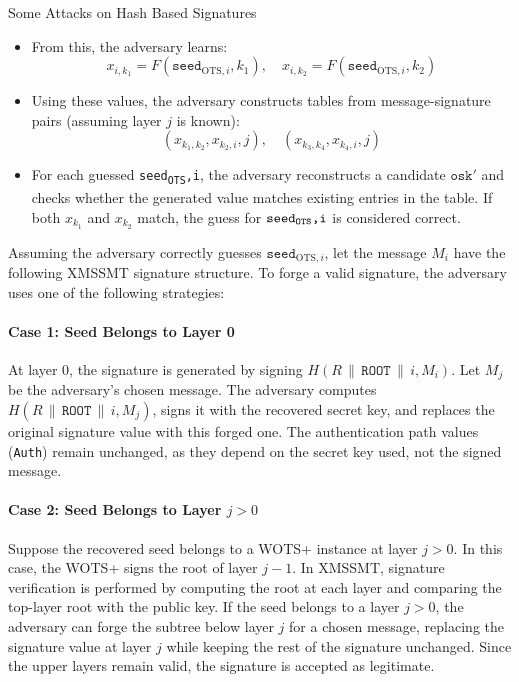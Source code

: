 \begin{section}{Some Attacks on Hash Based Signatures}
\begin{itemize}
    \item From this, the adversary learns:
    \[
    x_{i,k_1} = F(\texttt{seed}_{\text{OTS},i}, k_1), \quad x_{i,k_2} = F(\texttt{seed}_{\text{OTS},i}, k_2)
    \]
    
    \item Using these values, the adversary constructs tables from message-signature pairs (assuming layer $j$ is known):
    \[
    (x_{k_1,k_2}, x_{k_2,i}, j), \quad (x_{k_3,k_4}, x_{k_4,i}, j)
    \]
    
    \item For each guessed \texttt{seed\textsubscript{OTS},i}, the adversary reconstructs a candidate $\texttt{osk}'$ and checks whether the generated value matches existing entries in the table. If both $x_{k_1}$ and $x_{k_2}$ match, the guess for $\texttt{seed\textsubscript{OTS},i}$ is considered correct.
\end{itemize}

Assuming the adversary correctly guesses $\texttt{seed}_{\text{OTS},i}$, let the message $M_i$ have the following XMSSMT signature structure. To forge a valid signature, the adversary uses one of the following strategies:

\paragraph{Case 1: Seed Belongs to Layer 0}

At layer 0, the signature is generated by signing $H(R \,\|\, \texttt{ROOT} \,\|\, i, M_i)$. Let $M_j$ be the adversary’s chosen message. The adversary computes $H(R \,\|\, \texttt{ROOT} \,\|\, i, M_j)$, signs it with the recovered secret key, and replaces the original signature value with this forged one. The authentication path values (\texttt{Auth}) remain unchanged, as they depend on the secret key used, not the signed message.

\paragraph{Case 2: Seed Belongs to Layer $j > 0$}

Suppose the recovered seed belongs to a WOTS+ instance at layer $j > 0$. In this case, the WOTS+ signs the root of layer $j-1$. In XMSSMT, signature verification is performed by computing the root at each layer and comparing the top-layer root with the public key. If the seed belongs to a layer $j > 0$, the adversary can forge the subtree below layer $j$ for a chosen message, replacing the signature value at layer $j$ while keeping the rest of the signature unchanged. Since the upper layers remain valid, the signature is accepted as legitimate.


\end{section}
